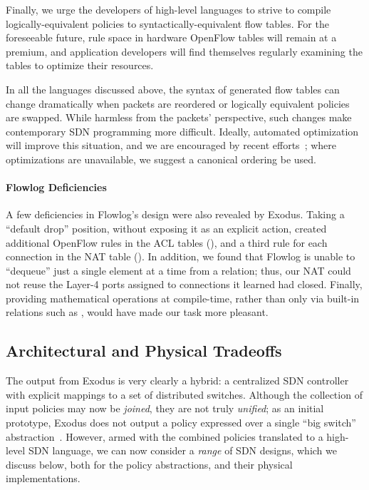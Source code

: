 Finally, we urge the developers of high-level languages to strive to compile
logically-equivalent policies to syntactically-equivalent flow tables.
For the foreseeable future, rule space in hardware OpenFlow tables
will remain at a premium, and application developers will find themselves
regularly examining the tables to optimize their resources.

In all the languages discussed above, the syntax of generated flow tables
can change dramatically when packets are reordered or logically equivalent
policies are swapped. While harmless from the packets' perspective, such changes
make contemporary SDN programming more difficult.
Ideally, automated optimization will improve this situation, and we are encouraged
by recent efforts~\cite{Kang:2013optimizing,Kanizo:2013palette}; where optimizations
are unavailable, we suggest a canonical ordering be used.



\paragraph{Flowlog Deficiencies} 

A few deficiencies in Flowlog's design were also revealed by Exodus.
Taking a ``default drop'' position, without exposing it as an explicit action, created additional
OpenFlow rules in the ACL tables (), and a third rule for each
connection in the NAT table ().
In addition, we found that Flowlog is unable to ``dequeue'' just a single element at a
time from a relation; thus, our NAT could not reuse the Layer-4 ports assigned to
connections it learned had closed.
Finally, providing mathematical operations at compile-time, rather than only
via built-in relations such as , would have made our task more pleasant.

\subsection{Architectural and Physical Tradeoffs}
\label{sec:physical-tradeoffs}

The output from Exodus is very clearly a hybrid: a centralized SDN controller with explicit
mappings to a set of distributed switches. Although the collection of input policies may
now be \emph{joined}, they are not truly \emph{unified}; as an initial prototype, Exodus
does not output a policy expressed over a single ``big switch'' abstraction~\cite{Casado:2010virtualizing,monsanto++:nsdi13-pyretic,Shenker:2011talk}.
However, armed with the combined policies translated to a high-level SDN language,
we can now consider a \emph{range} of SDN designs, which we discuss below,
both for the policy abstractions, and their physical implementations.

